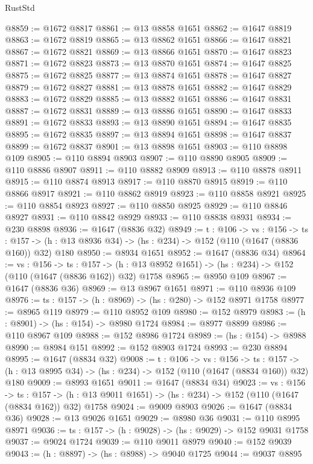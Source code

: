 \begin{lexlean}{RustStd}
\begin{coremodule}
@8859 := @1672 @8817
@8861 := @13 @8858 @1651
@8862 := @1647 @8819
@8863 := @1672 @8819
@8865 := @13 @8862 @1651
@8866 := @1647 @8821
@8867 := @1672 @8821
@8869 := @13 @8866 @1651
@8870 := @1647 @8823
@8871 := @1672 @8823
@8873 := @13 @8870 @1651
@8874 := @1647 @8825
@8875 := @1672 @8825
@8877 := @13 @8874 @1651
@8878 := @1647 @8827
@8879 := @1672 @8827
@8881 := @13 @8878 @1651
@8882 := @1647 @8829
@8883 := @1672 @8829
@8885 := @13 @8882 @1651
@8886 := @1647 @8831
@8887 := @1672 @8831
@8889 := @13 @8886 @1651
@8890 := @1647 @8833
@8891 := @1672 @8833
@8893 := @13 @8890 @1651
@8894 := @1647 @8835
@8895 := @1672 @8835
@8897 := @13 @8894 @1651
@8898 := @1647 @8837
@8899 := @1672 @8837
@8901 := @13 @8898 @1651
@8903 := @110 @8898 @109
@8905 := @110 @8894 @8903
@8907 := @110 @8890 @8905
@8909 := @110 @8886 @8907
@8911 := @110 @8882 @8909
@8913 := @110 @8878 @8911
@8915 := @110 @8874 @8913
@8917 := @110 @8870 @8915
@8919 := @110 @8866 @8917
@8921 := @110 @8862 @8919
@8923 := @110 @8858 @8921
@8925 := @110 @8854 @8923
@8927 := @110 @8850 @8925
@8929 := @110 @8846 @8927
@8931 := @110 @8842 @8929
@8933 := @110 @8838 @8931
@8934 := @230 @8898
@8936 := @1647 (@8836 @32)
@8949 := {t : @106} ->
  {vs : @156} ->
  {ts : @157} -> (h : @13 @8936 @34) -> (hs : @234) -> @152 (@110 (@1647 (@8836 @160)) @32) @180
@8950 := @8934 @1651
@8952 := @1647 (@8836 @34)
@8964 := {vs : @156} ->
  {ts : @157} -> (h : @13 @8952 @1651) -> (hs : @234) -> @152 (@110 (@1647 (@8836 @162)) @32) @1758
@8965 := @8950 @109
@8967 := @1647 (@8836 @36)
@8969 := @13 @8967 @1651
@8971 := @110 @8936 @109
@8976 := {ts : @157} -> (h : @8969) -> (hs : @280) -> @152 @8971 @1758
@8977 := @8965 @119
@8979 := @110 @8952 @109
@8980 := @152 @8979
@8983 := (h : @8901) -> (hs : @154) -> @8980 @1724
@8984 := @8977 @8899
@8986 := @110 @8967 @109
@8988 := @152 @8986 @1724
@8989 := (hs : @154) -> @8988
@8990 := @8984 @151
@8992 := @152 @8903 @1724
@8993 := @230 @8894
@8995 := @1647 (@8834 @32)
@9008 := {t : @106} ->
  {vs : @156} ->
  {ts : @157} -> (h : @13 @8995 @34) -> (hs : @234) -> @152 (@110 (@1647 (@8834 @160)) @32) @180
@9009 := @8993 @1651
@9011 := @1647 (@8834 @34)
@9023 := {vs : @156} ->
  {ts : @157} -> (h : @13 @9011 @1651) -> (hs : @234) -> @152 (@110 (@1647 (@8834 @162)) @32) @1758
@9024 := @9009 @8903
@9026 := @1647 (@8834 @36)
@9028 := @13 @9026 @1651
@9029 := @8980 @36
@9031 := @110 @8995 @8971
@9036 := {ts : @157} -> (h : @9028) -> (hs : @9029) -> @152 @9031 @1758
@9037 := @9024 @1724
@9039 := @110 @9011 @8979
@9040 := @152 @9039
@9043 := (h : @8897) -> (hs : @8988) -> @9040 @1725
@9044 := @9037 @8895

\end{coremodule}
\end{lexlean}
